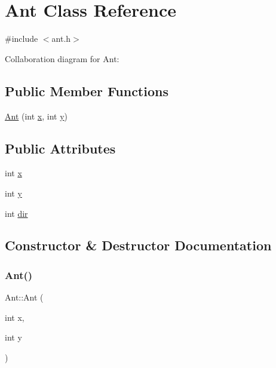 \hypertarget{classAnt}{}\section{Ant Class Reference}
\label{classAnt}


{\ttfamily \#include $<$ant.\+h$>$}



Collaboration diagram for Ant\+:
\subsection*{Public Member Functions}
\begin{DoxyCompactItemize}
\item 
\hyperlink{classAnt_a4f1a3a8388155501d0b2debffc1cbc70}{Ant} (int \hyperlink{classAnt_a8409e55184d47e3be2324354f00d8a27}{x}, int \hyperlink{classAnt_ac0d0527d48eb2fd1b78d10cc668ebcb4}{y})
\end{DoxyCompactItemize}
\subsection*{Public Attributes}
\begin{DoxyCompactItemize}
\item 
int \hyperlink{classAnt_a8409e55184d47e3be2324354f00d8a27}{x}
\item 
int \hyperlink{classAnt_ac0d0527d48eb2fd1b78d10cc668ebcb4}{y}
\item 
int \hyperlink{classAnt_a2d574125de62bc48aa408d0cbf0ef462}{dir}
\end{DoxyCompactItemize}


\subsection{Constructor \& Destructor Documentation}
\mbox{\label{classAnt_a4f1a3a8388155501d0b2debffc1cbc70}} 
\subsubsection{\texorpdfstring{Ant()}{Ant()}}
{\footnotesize\ttfamily Ant\+::\+Ant (\begin{DoxyParamCaption}\item[{int}]{x,  }\item[{int}]{y }\end{DoxyParamCaption})\hspace{0.3cm}{\ttfamily [inline]}}



